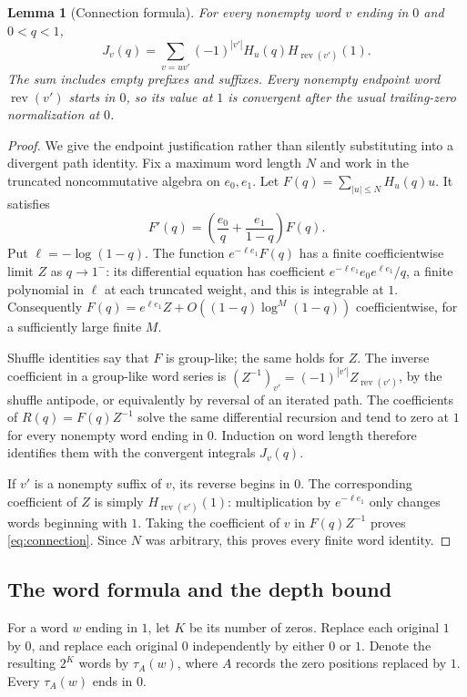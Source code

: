 \documentclass[11pt]{article}
\numberwithin{equation}{section}
\newtheorem{lemma}[theorem]{Lemma}
\theoremstyle{definition}\newtheorem{definition}[theorem]{Definition}
\theoremstyle{remark}\newtheorem{remark}[theorem]{Remark}
\begin{document}
\begin{lemma}[Connection formula]\label{lem:connection}
For every nonempty word $v$ ending in $0$ and $0<q<1$,
\begin{equation}\label{eq:connection}
 J_v(q)=\sum_{v=uv'}(-1)^{|v'|}H_u(q)H_{\operatorname{rev}(v')}(1).
\end{equation}
The sum includes empty prefixes and suffixes. Every nonempty endpoint
word $\operatorname{rev}(v')$ starts in $0$, so its value at $1$ is
convergent after the usual trailing-zero normalization at $0$.
\end{lemma}
\begin{proof}
We give the endpoint justification rather than silently substituting into
a divergent path identity. Fix a maximum word length $N$ and work in the
truncated noncommutative algebra on $e_0,e_1$. Let
$F(q)=\sum_{|u|\le N}H_u(q)u$. It satisfies
\[
 F'(q)=\left(\frac{e_0}{q}+\frac{e_1}{1-q}\right)F(q).
\]
Put $\ell=-\log(1-q)$. The function $e^{-\ell e_1}F(q)$ has a finite
coefficientwise limit $Z$ as $q\to1^-$: its differential equation has
coefficient $e^{-\ell e_1}e_0e^{\ell e_1}/q$, a finite polynomial in
$\ell$ at each truncated weight, and this is integrable at $1$.
Consequently
$F(q)=e^{\ell e_1}Z+O((1-q)\log^M(1-q))$
coefficientwise, for a sufficiently large finite $M$.

Shuffle identities say that $F$ is group-like; the same holds for $Z$.
The inverse coefficient in a group-like word series is
$(Z^{-1})_{v'}=(-1)^{|v'|}Z_{\operatorname{rev}(v')}$, by the shuffle
antipode, or equivalently by reversal of an iterated path.
The coefficients of $R(q)=F(q)Z^{-1}$ solve the same differential
recursion and tend to zero at $1$ for every nonempty word ending in $0$.
Induction on word length therefore identifies them with the convergent
integrals $J_v(q)$.

If $v'$ is a nonempty suffix of $v$, its reverse begins in $0$.
The corresponding coefficient of $Z$ is simply
$H_{\operatorname{rev}(v')}(1)$: multiplication by
$e^{-\ell e_1}$ only changes words beginning with $1$.
Taking the coefficient of $v$ in $F(q)Z^{-1}$ proves
\eqref{eq:connection}. Since $N$ was arbitrary, this proves every finite
word identity.
\end{proof}

\subsection{The word formula and the depth bound}
For a word $w$ ending in $1$, let $K$ be its number of zeros. Replace
each original $1$ by $0$, and replace each original $0$ independently
by either $0$ or $1$. Denote the resulting $2^K$ words by $\tau_A(w)$,
where $A$ records the zero positions replaced by $1$.
Every $\tau_A(w)$ ends in $0$.
\end{document}
